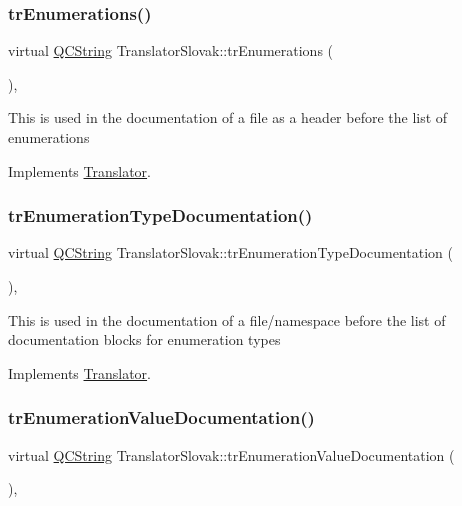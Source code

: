 \subsubsection{\texorpdfstring{trEnumerations()}{trEnumerations()}}
{\footnotesize\ttfamily virtual \mbox{\hyperlink{class_q_c_string}{Q\+C\+String}} Translator\+Slovak\+::tr\+Enumerations (\begin{DoxyParamCaption}{ }\end{DoxyParamCaption})\hspace{0.3cm}{\ttfamily [inline]}, {\ttfamily [virtual]}}

This is used in the documentation of a file as a header before the list of enumerations 

Implements \mbox{\hyperlink{class_translator}{Translator}}.

\mbox{\label{class_translator_slovak_a3d23075dd917dad6eacb9141e1ce6c21}} 
\subsubsection{\texorpdfstring{trEnumerationTypeDocumentation()}{trEnumerationTypeDocumentation()}}
{\footnotesize\ttfamily virtual \mbox{\hyperlink{class_q_c_string}{Q\+C\+String}} Translator\+Slovak\+::tr\+Enumeration\+Type\+Documentation (\begin{DoxyParamCaption}{ }\end{DoxyParamCaption})\hspace{0.3cm}{\ttfamily [inline]}, {\ttfamily [virtual]}}

This is used in the documentation of a file/namespace before the list of documentation blocks for enumeration types 

Implements \mbox{\hyperlink{class_translator}{Translator}}.

\mbox{\label{class_translator_slovak_a21fc43eb3598f02b0e9125ddbe8f72d8}} 
\subsubsection{\texorpdfstring{trEnumerationValueDocumentation()}{trEnumerationValueDocumentation()}}
{\footnotesize\ttfamily virtual \mbox{\hyperlink{class_q_c_string}{Q\+C\+String}} Translator\+Slovak\+::tr\+Enumeration\+Value\+Documentation (\begin{DoxyParamCaption}{ }\end{DoxyParamCaption})\hspace{0.3cm}{\ttfamily [inline]}, {\ttfamily [virtual]}}

